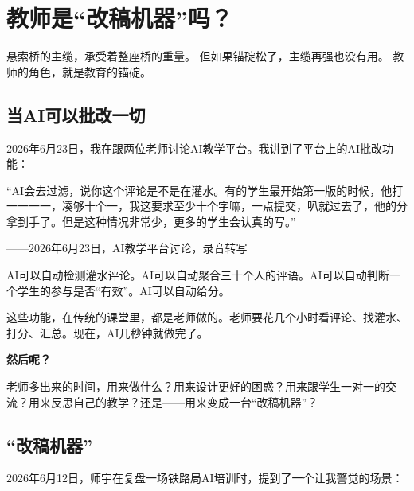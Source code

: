 
\chapter{教师是``改稿机器''吗？}

\vspace{0.5cm}

\begin{center}
{\small\color{muted} 悬索桥的主缆，承受着整座桥的重量。}
{\small\color{muted} 但如果锚碇松了，主缆再强也没有用。}
{\small\color{muted} 教师的角色，就是教育的锚碇。}
\end{center}

\vspace{1cm}

\section{当AI可以批改一切}

2026年6月23日，我在跟两位老师讨论AI教学平台。我讲到了平台上的AI批改功能：

\begin{shiyu-inline}
``AI会去过滤，说你这个评论是不是在灌水。有的学生最开始第一版的时候，他打一一一一，凑够十个一，我这要求至少十个字嘛，一点提交，叭就过去了，他的分拿到手了。但是这种情况非常少，更多的学生会认真的写。''

\hfill ——2026年6月23日，AI教学平台讨论，录音转写
\end{shiyu-inline}

AI可以自动检测灌水评论。AI可以自动聚合三十个人的评语。AI可以自动判断一个学生的参与是否``有效''。AI可以自动给分。

这些功能，在传统的课堂里，都是老师做的。老师要花几个小时看评论、找灌水、打分、汇总。现在，AI几秒钟就做完了。

\textbf{然后呢？}

老师多出来的时间，用来做什么？用来设计更好的困惑？用来跟学生一对一的交流？用来反思自己的教学？还是——用来变成一台``改稿机器''？

\section{``改稿机器''}

2026年6月12日，师宇在复盘一场铁路局AI培训时，提到了一个让我警觉的场景：

